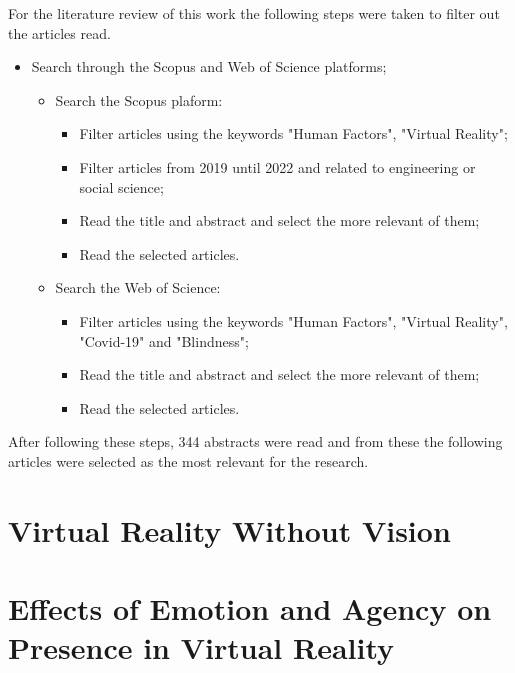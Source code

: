 For the literature review of this work the following steps were taken to filter out the articles read.
\begin{itemize}
    \item Search through the Scopus and Web of Science platforms;
    \begin{itemize}
        \item Search the Scopus plaform:
        \begin{itemize}
            \item Filter articles using the keywords "Human Factors", "Virtual Reality";
            \item Filter articles from 2019 until 2022 and related to engineering or social science;
            \item Read the title and abstract and select the more relevant of them;
            \item Read the selected articles.
        \end{itemize}
        \item Search the Web of Science:
        \begin{itemize}
            \item Filter articles using the keywords "Human Factors", "Virtual Reality", "Covid-19" and "Blindness";
            \item Read the title and abstract and select the more relevant of them;
            \item Read the selected articles.
        \end{itemize}
    \end{itemize}
\end{itemize}

After following these steps, 344 abstracts were read and from these the following articles were selected as the most relevant for the research.

\section{Virtual Reality Without Vision}
\label{sec:vr_without_vision}


\section{Effects of Emotion and Agency on Presence in Virtual Reality}
\label{sec:emotion_presence_vr}


